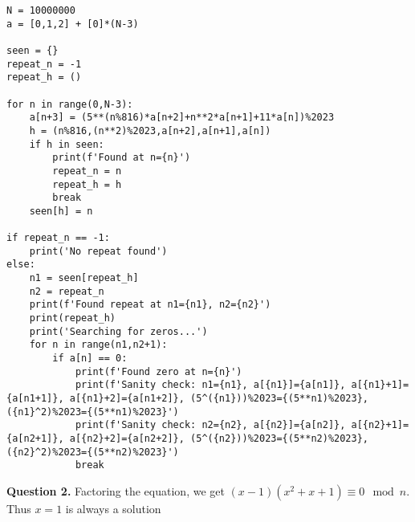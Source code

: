 \documentclass[letterpaper, reqno,11pt]{article}
\begin{document}
\begin{lstlisting}
N = 10000000
a = [0,1,2] + [0]*(N-3)

seen = {}
repeat_n = -1
repeat_h = ()

for n in range(0,N-3):
    a[n+3] = (5**(n%816)*a[n+2]+n**2*a[n+1]+11*a[n])%2023
    h = (n%816,(n**2)%2023,a[n+2],a[n+1],a[n])
    if h in seen:
        print(f'Found at n={n}')
        repeat_n = n
        repeat_h = h
        break
    seen[h] = n

if repeat_n == -1:
    print('No repeat found')
else:
    n1 = seen[repeat_h]
    n2 = repeat_n
    print(f'Found repeat at n1={n1}, n2={n2}')
    print(repeat_h)
    print('Searching for zeros...')
    for n in range(n1,n2+1):
        if a[n] == 0:
            print(f'Found zero at n={n}')
            print(f'Sanity check: n1={n1}, a[{n1}]={a[n1]}, a[{n1}+1]={a[n1+1]}, a[{n1}+2]={a[n1+2]}, (5^({n1}))%2023={(5**n1)%2023}, ({n1}^2)%2023={(5**n1)%2023}')
            print(f'Sanity check: n2={n2}, a[{n2}]={a[n2]}, a[{n2}+1]={a[n2+1]}, a[{n2}+2]={a[n2+2]}, (5^({n2}))%2023={(5**n2)%2023}, ({n2}^2)%2023={(5**n2)%2023}')
            break
\end{lstlisting}

{\medskip\noindent\bf Question 2.} Factoring the equation, we get $(x-1)(x^2+x+1)\equiv 0\mod n$. Thus $x=1$ is always a solution
\end{document}
